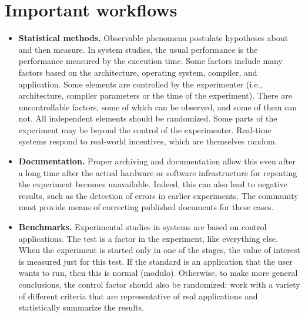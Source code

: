 \section{Important workflows}
\begin{itemize}
    \item \textbf{Statistical methods.} Observable phenomena postulate hypotheses about and then measure. In system studies, the usual performance is the performance measured by the execution time. Some factors include many factors based on the architecture, operating system, compiler, and application. Some elements are controlled by the experimenter (i.e., architecture, compiler parameters or the time of the experiment). There are uncontrollable factors, some of which can be observed, and some of them can not. All independent elements should be randomized. Some parts of the experiment may be beyond the control of the experimenter. Real-time systems respond to real-world incentives, which are themselves random.
    \item \textbf{Documentation.} Proper archiving and documentation allow this even after a long time after the actual hardware or software infrastructure for repeating the experiment becomes unavailable. Indeed, this can also lead to negative results, such as the detection of errors in earlier experiments. The community must provide means of correcting published documents for these cases.
    \item \textbf{Benchmarks.} Experimental studies in systems are based on control applications. The test is a factor in the experiment, like everything else. When the experiment is started only in one of the stages, the value of interest is measured just for this test. If the standard is an application that the user wants to run, then this is normal (modulo). Otherwise, to make more general conclusions, the control factor should also be randomized: work with a variety of different criteria that are representative of real applications and statistically summarize the results.
\end{itemize}
